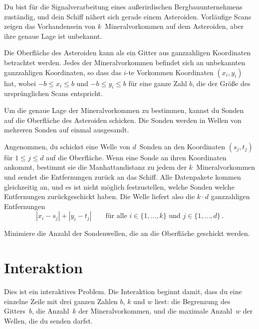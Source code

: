 

\noindent
Du bist für die Signalverarbeitung eines außerirdischen Bergbauunternehmens zuständig, und dein Schiff nähert sich gerade einem Asteroiden. 
Vorläufige Scans zeigen das Vorhandensein von $k$~Mineralvorkommen auf dem Asteroiden, aber ihre genaue Lage ist unbekannt.

\medskip

Die Oberfläche des Asteroiden kann als ein Gitter aus ganzzahligen Koordinaten betrachtet werden.
Jedes der Mineralvorkommen befindet sich an unbekannten ganzzahligen Koordinaten, so dass das $i$-te Vorkommen Koordinaten $(x_i, y_i)$ hat, wobei  
$-b \le x_i \le b$ und $-b\le y_i \le b$ %
für eine ganze Zahl $b$, die der Größe des ursprünglichen Scans entspricht.

Um die genaue Lage der Mineralvorkommen zu bestimmen, kannst du Sonden auf die Oberfläche des Asteroiden schicken. 
Die Sonden werden in Wellen von mehreren Sonden auf einmal ausgesandt.

Angenommen, du schickst eine Welle von $d$~Sonden an den Koordinaten $(s_j,t_j)$ für $1\leq j\leq d$ auf die Oberfläche.
Wenn eine Sonde an ihren Koordinaten ankommt, bestimmt sie die Manhattandistanz zu jedem der $k$~Mineralvorkommen und sendet die Entfernungen zurück an das Schiff. 
Alle Datenpakete kommen gleichzeitig an, und es ist nicht möglich festzustellen, welche Sonden welche Entfernungen zurückgeschickt haben. 
Die Welle liefert also die $k\cdot d$ ganzzahligen Entfernungen
\[|x_i-s_j| + |y_i - t_j| \qquad\text{für alle } i \in \{1,\ldots,k\} \text{ und } j \in\{ 1,\ldots,d\}\,.\]

Minimiere die Anzahl der Sondenwellen, die an die Oberfläche geschickt werden.


\section*{Interaktion}

Dies ist ein interaktives Problem.
Die Interaktion beginnt damit, dass du eine einzelne Zeile mit drei ganzen Zahlen $b$, $k$ und $w$ liest:
die Begrenzung des Gitters~$b$,
die Anzahl~$k$ der Mineralvorkommen,
und die maximale Anzahl~$w$ der Wellen, die du senden darfst.

